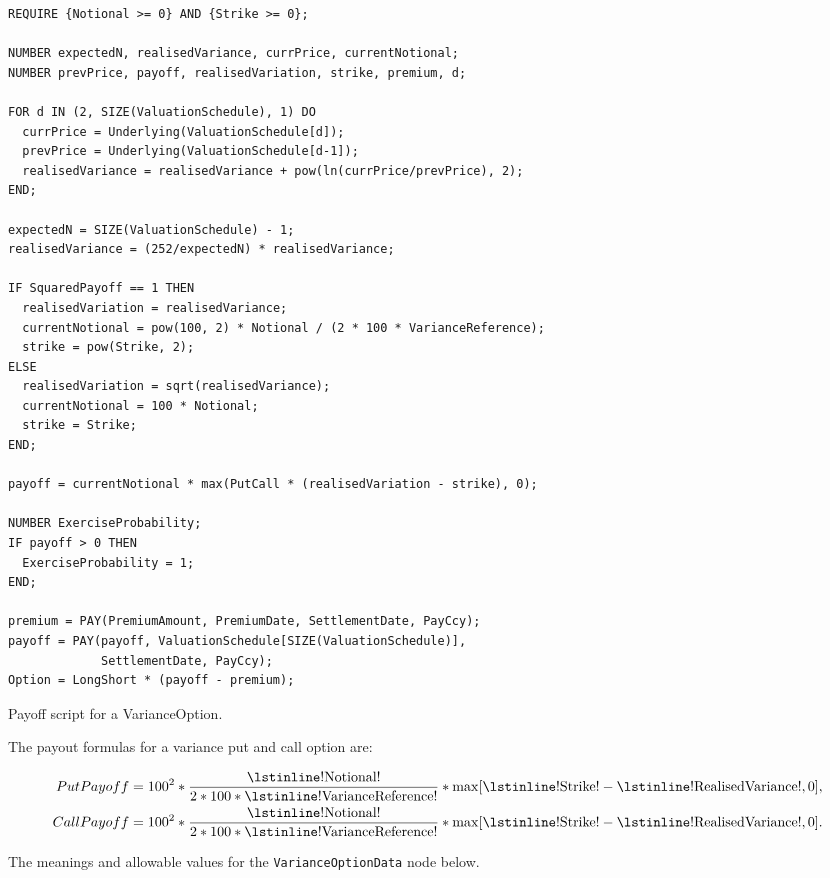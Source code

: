 \begin{listing}[hbt]
\begin{verbatim}
REQUIRE {Notional >= 0} AND {Strike >= 0};

NUMBER expectedN, realisedVariance, currPrice, currentNotional;
NUMBER prevPrice, payoff, realisedVariation, strike, premium, d;

FOR d IN (2, SIZE(ValuationSchedule), 1) DO
  currPrice = Underlying(ValuationSchedule[d]);
  prevPrice = Underlying(ValuationSchedule[d-1]);
  realisedVariance = realisedVariance + pow(ln(currPrice/prevPrice), 2);
END;

expectedN = SIZE(ValuationSchedule) - 1;
realisedVariance = (252/expectedN) * realisedVariance;

IF SquaredPayoff == 1 THEN
  realisedVariation = realisedVariance;
  currentNotional = pow(100, 2) * Notional / (2 * 100 * VarianceReference);
  strike = pow(Strike, 2);
ELSE
  realisedVariation = sqrt(realisedVariance);
  currentNotional = 100 * Notional;
  strike = Strike;
END;

payoff = currentNotional * max(PutCall * (realisedVariation - strike), 0);

NUMBER ExerciseProbability;
IF payoff > 0 THEN
  ExerciseProbability = 1;
END;

premium = PAY(PremiumAmount, PremiumDate, SettlementDate, PayCcy);
payoff = PAY(payoff, ValuationSchedule[SIZE(ValuationSchedule)],
             SettlementDate, PayCcy);
Option = LongShort * (payoff - premium);
\end{verbatim}
\caption{Payoff script for a VarianceOption.}
\label{lst:variance_option}
\end{listing}

The payout formulas for a variance put and call option are:

\begin{align*}
  Put Payoff &= 100^2 * \frac{\text{\lstinline!Notional!}}{2 * 100 * \text{\lstinline!VarianceReference!}} * \max[\text{\lstinline!Strike!} - \text{\lstinline!RealisedVariance!}, 0], \\
  Call Payoff &= 100^2 * \frac{\text{\lstinline!Notional!}}{2 * 100 * \text{\lstinline!VarianceReference!}} * \max[\text{\lstinline!Strike!} - \text{\lstinline!RealisedVariance!}, 0].
\end{align*}

The meanings and allowable values for the \lstinline!VarianceOptionData! node below.

